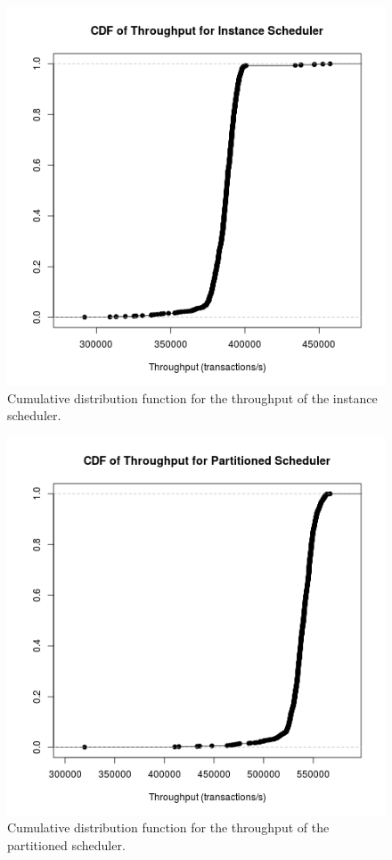 \begin{figure}
\center
\includegraphics[width=\textwidth]{instance_throughput_cdf.png}
\caption{Cumulative distribution function for the throughput of the instance scheduler. \label{instance_throughput}}
\end{figure}

\begin{figure}
\center
\includegraphics[width=\textwidth]{partitioned_throughput_cdf.png}
\caption{Cumulative distribution function for the throughput of the partitioned scheduler. \label{partitioned_throughput}}
\end{figure}


